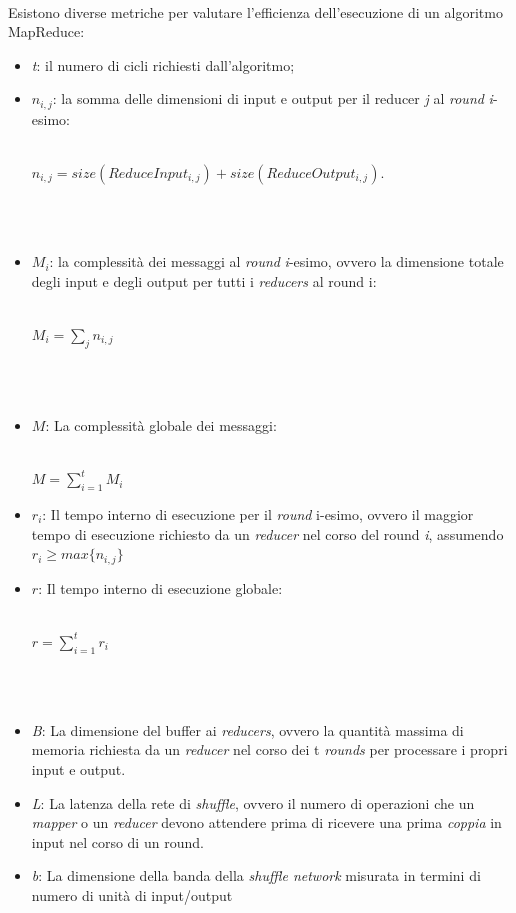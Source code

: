\documentclass[a4paper,11pt]{report}
\begin{document}
\paragraph{}
Esistono diverse metriche per valutare l'efficienza dell'esecuzione di un algoritmo MapReduce:
\begin{itemize}
 \item \emph{t}: il numero di cicli richiesti dall'algoritmo;
 \item $n_{i,j}$: la somma delle dimensioni di input e output per il reducer \emph j al \emph{round} \emph i-esimo:\\\\
     \centerline{$n_{i,j} = size(ReduceInput_{i,j}) + size(ReduceOutput_{i,j})$.}\\\\
 \item $M_i$: la complessità dei messaggi al \emph{round} \emph i-esimo, ovvero la dimensione totale degli input e degli output per tutti i
\emph{reducers} al round i:\\\\
\centerline{$M_i=\sum_{j}n_{i,j}$}\\\\
 \item $M$: La complessità globale dei messaggi:\\\\
\centerline{$M = \sum_{i=1}^t M_i$}
 \item $r_i$: Il tempo interno di esecuzione per il \emph{round} i-esimo, ovvero il maggior tempo di esecuzione richiesto da un
\emph{reducer}
    nel corso del round \emph i, assumendo $r_i \ge max\{ n_{i,j}\}$
 \item $r$: Il tempo interno di esecuzione globale:\\\\
      \centerline{$r= \sum_{i=1}^t r_i$}\\\\
 \item \emph{B}: La dimensione del buffer ai \emph{reducers}, ovvero la quantità massima di memoria richiesta da un \emph{reducer} nel corso
dei t \emph{rounds}
per processare i propri input e output.
 \item \emph{L}: La latenza della rete di \emph{shuffle}, ovvero il numero di operazioni che un \emph{mapper} o un \emph{reducer} devono
attendere prima di ricevere una prima 
\emph{coppia} in input nel corso di un round. 
 \item \emph{b}: La dimensione della banda della \emph{shuffle network} misurata in termini di numero di unità di input/output

\end{itemize}
\end{document}
